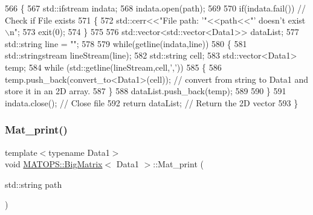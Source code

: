 \begin{DoxyCode}
566                 \{
567                     std::ifstream indata;
568                     indata.open(path);
569 
570                     \textcolor{keywordflow}{if}(indata.fail()) \textcolor{comment}{// Check if File exists}
571                     \{
572                         std::cerr<<\textcolor{stringliteral}{"File path: '"}<<path<<\textcolor{stringliteral}{"' doesn't exist\(\backslash\)n"};
573                         exit(0);
574                     \}
575 
576                     std::vector<std::vector<Data1>> dataList;
577                     std::string line = \textcolor{stringliteral}{""};
578 
579                     \textcolor{keywordflow}{while}(getline(indata,line))
580                     \{
581                         std::stringstream lineStream(line);
582                         std::string cell;
583                         std::vector<Data1> temp;
584                         \textcolor{keywordflow}{while} (std::getline(lineStream,cell,\textcolor{charliteral}{','}))
585                         \{
586                             temp.push\_back(convert\_to<Data1>(cell)); \textcolor{comment}{// convert from string to Data1 and
       store it in an 2D array.}
587                         \}
588                         dataList.push\_back(temp);
589 
590                     \}
591                     indata.close(); \textcolor{comment}{// Close file}
592                     \textcolor{keywordflow}{return} dataList; \textcolor{comment}{// Return the 2D vector }
593                 \}
\end{DoxyCode}
\mbox{\label{classMATOPS_1_1BigMatrix_a2b3003374e008ff98f763c29aa4e3c07}} 
\subsubsection{\texorpdfstring{Mat\+\_\+print()}{Mat\_print()}}
{\footnotesize\ttfamily template$<$typename Data1$>$ \\
void \hyperlink{classMATOPS_1_1BigMatrix}{M\+A\+T\+O\+P\+S\+::\+Big\+Matrix}$<$ Data1 $>$\+::Mat\+\_\+print (\begin{DoxyParamCaption}\item[{std\+::string}]{path }\end{DoxyParamCaption})\hspace{0.3cm}{\ttfamily [inline]}}



